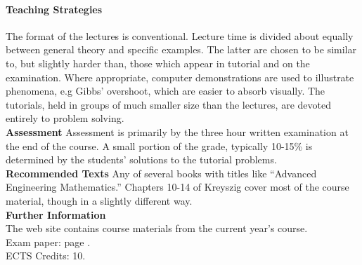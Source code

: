 \paragraph{Teaching Strategies}
The format of the lectures is conventional.  Lecture time is divided
about equally between general theory and specific examples.  The latter
are chosen to be similar to, but slightly harder than, those which appear
in tutorial and on the examination.  Where appropriate, computer
demonstrations are used to illustrate phenomena, e.g Gibbs' overshoot,
which are easier to absorb visually.
The tutorials, held in groups of
much smaller size than the lectures, are devoted entirely
to problem solving.
\vspace{0.5cm}
\\
\textbf{Assessment}
Assessment is primarily by the three hour
written examination at the end of the course.
A small portion of the grade, typically 10-15\%
is determined by the students' solutions
to the tutorial problems.
\vspace{0.5cm}
\\
\textbf{Recommended Texts}
Any of several books with titles like ``Advanced Engineering
Mathematics.''  Chapters 10-14 of Kreyszig cover most of the course
material, though in a slightly different way.
\vspace{0.5cm}
\\
\textbf{Further Information}~\\
The web site  contains
course materials from the current year's course.\\
Exam paper: page \pageref{3E1}.\\
ECTS Credits: 10.
